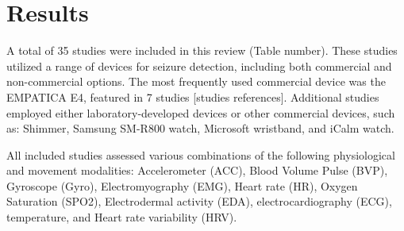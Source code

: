 \section{Results}

A total of 35 studies were included in this review (Table number). These studies utilized a range of devices for seizure detection, including both commercial and non-commercial options. The most frequently used commercial device was the EMPATICA E4, featured in 7 studies [studies references]. Additional studies employed either laboratory-developed devices or other commercial devices, such as: Shimmer, Samsung SM-R800 watch, Microsoft wristband, and iCalm watch.

All included studies assessed various combinations of the following physiological and movement modalities: Accelerometer (ACC), Blood Volume Pulse (BVP), Gyroscope (Gyro), Electromyography (EMG), Heart rate (HR), Oxygen Saturation (SPO2), Electrodermal activity (EDA), electrocardiography (ECG), temperature, and Heart rate variability (HRV).







